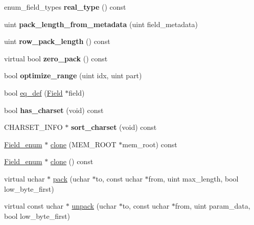 \begin{DoxyCompactItemize}
\mbox{\label{classField__enum_a8dc8e0c240d6b96e61f063f253f7292e}} 
enum\+\_\+field\+\_\+types {\bfseries real\+\_\+type} () const
\item 
\mbox{\label{classField__enum_a5c89228ec01634565fa33c38be6b10c0}} 
uint {\bfseries pack\+\_\+length\+\_\+from\+\_\+metadata} (uint field\+\_\+metadata)
\item 
\mbox{\label{classField__enum_a498d84c4053bc499a78c9337e6d616d2}} 
uint {\bfseries row\+\_\+pack\+\_\+length} () const
\item 
\mbox{\label{classField__enum_a43b4126b28e70f54711330adf5ffe105}} 
virtual bool {\bfseries zero\+\_\+pack} () const
\item 
\mbox{\label{classField__enum_afabe3f58bbe41061991b5988003b0b49}} 
bool {\bfseries optimize\+\_\+range} (uint idx, uint part)
\item 
bool \mbox{\hyperlink{classField__enum_a56dbcedd28fd3cd4ae349235462f1101}{eq\+\_\+def}} (\mbox{\hyperlink{classField}{Field}} $\ast$field)
\item 
\mbox{\label{classField__enum_a263b5009dc9809ff3525e53df661181d}} 
bool {\bfseries has\+\_\+charset} (void) const
\item 
\mbox{\label{classField__enum_a3b6a76f51a7b19ed8664c42588025cbb}} 
C\+H\+A\+R\+S\+E\+T\+\_\+\+I\+N\+FO $\ast$ {\bfseries sort\+\_\+charset} (void) const
\item 
\mbox{\hyperlink{classField__enum}{Field\+\_\+enum}} $\ast$ \mbox{\hyperlink{classField__enum_a47e937e56eb39c90f99f19379939d9a8}{clone}} (M\+E\+M\+\_\+\+R\+O\+OT $\ast$mem\+\_\+root) const
\item 
\mbox{\hyperlink{classField__enum}{Field\+\_\+enum}} $\ast$ \mbox{\hyperlink{classField__enum_a70a7230248a5c8c40751fe0f99f6d551}{clone}} () const
\item 
virtual uchar $\ast$ \mbox{\hyperlink{classField__enum_ab9e1135fdf17255f7a96193463d58bdd}{pack}} (uchar $\ast$to, const uchar $\ast$from, uint max\+\_\+length, bool low\+\_\+byte\+\_\+first)
\item 
virtual const uchar $\ast$ \mbox{\hyperlink{classField__enum_a94bb8c13a4729eb7be3acf8d3c59904c}{unpack}} (uchar $\ast$to, const uchar $\ast$from, uint param\+\_\+data, bool low\+\_\+byte\+\_\+first)
\end{DoxyCompactItemize}
